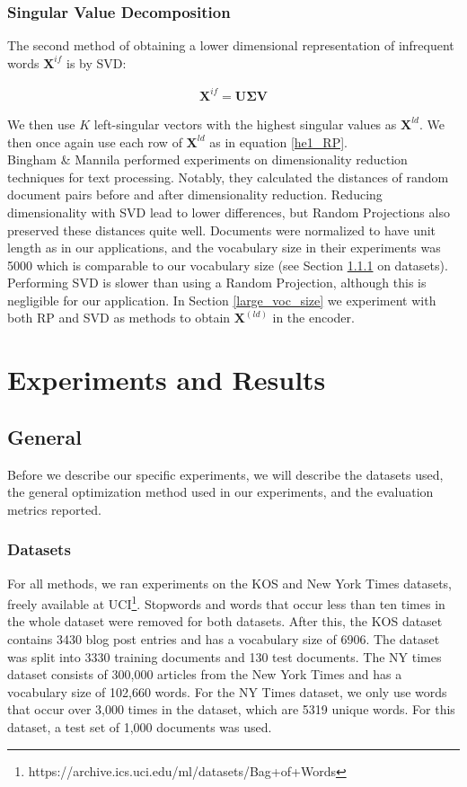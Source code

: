 \documentclass{report}
\begin{document}
\subsection{Singular Value Decomposition}\label{SVD}
The second method of obtaining a lower dimensional representation of infrequent words $\mathbf{X}^{if}$ is by SVD:

\begin{align}
\mathbf{X}^{if} = \mathbf{U\Sigma V}
\end{align}

We then use $K$ left-singular vectors with the highest singular values as $\mathbf{X}^{ld}$. We then once again use each row of $\mathbf{X}^{ld}$ as in equation \ref{he1_RP}.\\
 Bingham \& Mannila \cite{bingham2001random} performed experiments on dimensionality reduction techniques for text processing. Notably, they calculated the distances of random document pairs before and after dimensionality reduction. Reducing dimensionality with SVD lead to lower differences, but Random Projections also preserved these distances quite well. Documents were normalized to have unit length as in our applications, and the vocabulary size in their experiments was 5000 which is comparable to our vocabulary size (see Section \ref{datasets} on datasets). Performing SVD is slower than using a Random Projection, although this is negligible for our application. In Section \ref{large_voc_size} we experiment with both RP and SVD as methods to obtain $\mathbf{X}^{(ld)}$ in the encoder.


\chapter{Experiments and Results}\label{experiments}
\section{General}
Before we describe our specific experiments, we will describe the datasets used, the general optimization method used in our experiments, and the evaluation metrics reported. 
	\subsection{Datasets}\label{datasets}
	For all methods, we ran experiments on the KOS and New York Times datasets, freely available at UCI\footnote{https://archive.ics.uci.edu/ml/datasets/Bag+of+Words}. Stopwords and words that occur less than ten times in the whole dataset were removed for both datasets. After this, the KOS dataset contains 3430 blog post entries and has a vocabulary size of 6906. The dataset was split into 3330 training documents and 130 test documents. The NY times dataset consists of 300,000 articles from the New York Times and has a vocabulary size of 102,660 words. For the NY Times dataset, we only use words that occur over 3,000 times in the dataset, which are 5319 unique words. For this dataset, a test set of 1,000 documents was used.
	
\end{document}
